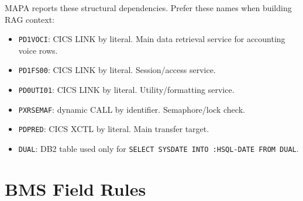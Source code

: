 \documentclass[11pt,a4paper]{article}
\begin{document}
MAPA reports these structural dependencies. Prefer these names when building RAG context:

\begin{itemize}
  \item \texttt{PD1VOCI}: CICS LINK by literal. Main data retrieval service for accounting voice rows.
  \item \texttt{PD1FS00}: CICS LINK by literal. Session/access service.
  \item \texttt{PD0UTI01}: CICS LINK by literal. Utility/formatting service.
  \item \texttt{PXRSEMAF}: dynamic CALL by identifier. Semaphore/lock check.
  \item \texttt{PDPRED}: CICS XCTL by literal. Main transfer target.
  \item \texttt{DUAL}: DB2 table used only for \texttt{SELECT SYSDATE INTO :HSQL-DATE FROM DUAL}.
\end{itemize}

\section*{BMS Field Rules}
\end{document}
